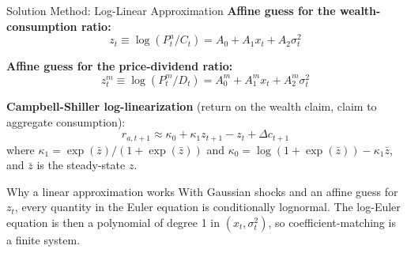 \documentclass{beamer}
\begin{document}
\begin{frame}{Solution Method: Log-Linear Approximation}
    \textbf{Affine guess for the wealth-consumption ratio:}
    \begin{equation}
        z_t \equiv \log(P_t^a / C_t) = A_0 + A_1 x_t + A_2 \sigma_t^2
    \end{equation}

    \textbf{Affine guess for the price-dividend ratio:}
    \begin{equation}
        z_t^m \equiv \log(P_t^m / D_t) = A_0^m + A_1^m x_t + A_2^m \sigma_t^2
    \end{equation}

    \vspace{0.3cm}
    \textbf{Campbell-Shiller log-linearization} (return on the wealth claim, claim to aggregate consumption):
    \begin{equation}
        r_{a,t+1} \approx \kappa_0 + \kappa_1 z_{t+1} - z_t + \Delta c_{t+1}
    \end{equation}
    where $\kappa_1 = \exp(\bar{z})/(1+\exp(\bar{z}))$ and $\kappa_0 = \log(1+\exp(\bar{z})) - \kappa_1\bar{z}$, and $\bar{z}$ is the steady-state $z$.
    \vspace{2pt}
    \begin{block}{Why a linear approximation works}
    	With Gaussian shocks and an affine guess for $z_t$, every quantity in the Euler equation is conditionally lognormal. The log-Euler equation is then a polynomial of degree 1 in $(x_t,\sigma_t^2)$, so coefficient-matching is a finite system.
    \end{block}
\end{frame}
\end{document}
